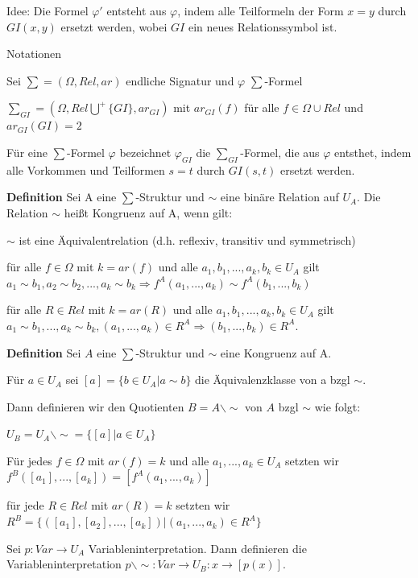 \documentclass[a4paper]{article}
\renewcommand{\note}[2]{\begin{noteBox} \textbf{#1} #2 \end{noteBox}}
\begin{document}
\begin{multicols}{3}
  Idee: Die Formel $\varphi'$ entsteht aus $\varphi$, indem alle Teilformeln der Form $x=y$ durch $GI(x,y)$ ersetzt werden, wobei $GI$ ein neues Relationssymbol ist.

  Notationen
  \begin{itemize*}
    \item Sei $\sum=(\Omega,Rel,ar)$ endliche Signatur und $\varphi$ $\sum$-Formel
    \item $\sum_{GI} = (\Omega, Rel\bigcup^+\{GI\},ar_{GI})$ mit $ar_{GI}(f)$ für alle $f\in\Omega\cup Rel$ und $ar_{GI}(GI)=2$
    \item Für eine $\sum$-Formel $\varphi$ bezeichnet $\varphi_{GI}$ die $\sum_{GI}$-Formel, die aus $\varphi$ entsthet, indem alle Vorkommen und Teilformen $s=t$ durch $GI(s,t)$ ersetzt werden.
  \end{itemize*}

  \note{Definition}{Sei A eine $\sum$-Struktur und $\sim$ eine binäre Relation auf $U_A$. Die Relation $\sim$ heißt Kongruenz auf A, wenn gilt:
    \begin{itemize*}
      \item $\sim$ ist eine Äquivalentrelation (d.h. reflexiv, transitiv und symmetrisch)
      \item für alle $f\in\Omega$ mit $k=ar(f)$ und alle $a_1,b_1,...,a_k,b_k\in U_A$ gilt $a_1\sim b_1,a_2\sim b_2,...,a_k\sim b_k\Rightarrow f^A(a_1,...,a_k)\sim f^A(b_1,...,b_k)$
      \item für alle $R\in Rel$ mit $k=ar(R)$ und alle $a_1,b_1,...,a_k,b_k\in U_A$ gilt $a_1\sim b_1,...,a_k\sim b_k,(a_1,...,a_k)\in R^A\Rightarrow (b_1,...,b_k)\in R^A$.
    \end{itemize*}
  }

  \note{Definition}{Sei $A$ eine $\sum$-Struktur und $\sim$ eine Kongruenz auf A.
    \begin{enumerate*}
      \item Für $a\in U_A$ sei $[a]=\{b\in U_A|a\sim b\}$ die Äquivalenzklasse von a bzgl $\sim$.
      \item Dann definieren wir den Quotienten $B=A\backslash \sim$ von $A$ bzgl $\sim$ wie folgt:
      \begin{itemize*}
        \item $U_B=U_A\backslash\sim = \{[a]|a\in U_A\}$
        \item Für jedes $f\in\Omega$ mit $ar(f)=k$ und alle $a_1,...,a_k\in U_A$ setzten wir $f^B([a_1],...,[a_k])=[f^A(a_1,...,a_k)]$
        \item für jede $R\in Rel$ mit $ar(R)=k$ setzten wir $R^B=\{([a_1],[a_2],...,[a_k])|(a_1,...,a_k)\in R^A\}$
      \end{itemize*}
      \item Sei $p:Var\rightarrow U_A$ Variableninterpretation. Dann definieren die Variableninterpretation $p\backslash\sim: Var\rightarrow U_B:x\rightarrow[p(x)]$.
    \end{enumerate*}
  }


\end{multicols}
\end{document}
